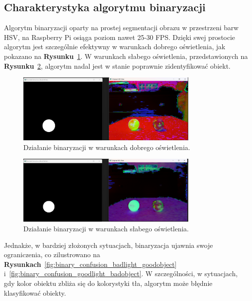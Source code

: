 \documentclass[a4paper,twoside,12pt]{book}
\begin{document}
\newpage
\subsection{Charakterystyka algorytmu binaryzacji}

Algorytm binaryzacji oparty na prostej segmentacji obrazu w przestrzeni barw HSV, na Raspberry Pi osiąga poziom nawet 25-30 FPS. Dzięki swej prostocie algorytm jest szczególnie efektywny w warunkach dobrego oświetlenia, jak pokazano na \textbf{Rysunku}~\ref{fig:binary_confusion_goodlight}.
W warunkach słabego oświetlenia, przedstawionych na \textbf{Rysunku}~\ref{fig:binary_confusion_badlight}, algorytm nadal jest w stanie poprawnie zidentyfikować obiekt. 

\begin{figure}[h]
    \centering
    \includegraphics[width=0.8\textwidth]{Images/Porownanie/Binaryzacja/Zrzut ekranu 2025-01-02 194021.png}
    \caption{Działanie binaryzacji w warunkach dobrego oświetlenia.}
    \label{fig:binary_confusion_goodlight}
\end{figure}

\begin{figure}[h]
    \centering
    \includegraphics[width=0.8\textwidth]{Images/Porownanie/Binaryzacja/Zrzut ekranu 2025-01-02 194004.png}
    \caption{Działanie binaryzacji w warunkach słabego oświetlenia.}
    \label{fig:binary_confusion_badlight}
\end{figure}

\newpage

Jednakże, w bardziej złożonych sytuacjach, binaryzacja ujawnia swoje ograniczenia, co zilustrowano na \textbf{Rysunkach}~\ref{fig:binary_confusion_badlight_goodobject} i~\ref{fig:binary_confusion_goodlight_badobject}. W szczególności, w sytuacjach, gdy kolor obiektu zbliża się do kolorystyki tła, algorytm może błędnie klasyfikować obiekty.
\end{document}
